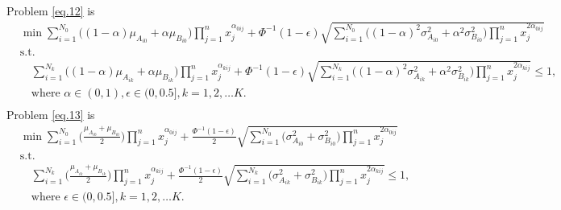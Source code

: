 Problem \ref{eq.12} is
\begin{equation}\label{eq.12}
	\begin{aligned}
		&	\min \sum\limits_{i=1}^{N_0}\big((1-\alpha)\mu_{A_{i0}}+\alpha\mu_{B_{i0}}\big)\prod\limits_{j=1}^{n}x_j^{\alpha_{0ij}}+\Phi^{-1}(1-\epsilon)\sqrt{\sum\limits_{i=1}^{N_0}\big((1-\alpha)^2\sigma_{A_{i0}}^2+\alpha^2\sigma_{B_{i0}}^2\big)\prod\limits_{j=1}^{n}x_j^{2\alpha_{0ij}}} \\
		&	\text{s.t.}\\
		& \quad \sum\limits_{i=1}^{N_k}\big((1-\alpha)\mu_{A_{ik}}+\alpha\mu_{B_{ik}}\big)\prod\limits_{j=1}^{n}x_j^{\alpha_{kij}}+\Phi^{-1}(1-\epsilon)\sqrt{\sum\limits_{i=1}^{N_k}\big((1-\alpha)^2\sigma_{A_{ik}}^2+\alpha^2\sigma_{B_{ik}}^2\big)\prod\limits_{j=1}^{n}x_j^{2\alpha_{kij}}}\leq 1,\\
		& \quad \text{where } \alpha \in (0,1), \epsilon \in(0,0.5], k=1,2,\ldots K.\\
	\end{aligned}
\end{equation}
Problem \ref{eq.13} is
\begin{equation}\label{eq.13}
	\begin{aligned}
		&	\min \sum\limits_{i=1}^{N_0}\bigg(\frac{\mu_{A_{i0}}+\mu_{B_{i0}}}{2}\bigg)\prod\limits_{j=1}^{n}x_j^{\alpha_{0ij}}+\frac{\Phi^{-1}(1-\epsilon)}{2}\sqrt{\sum\limits_{i=1}^{N_0}\big(\sigma_{A_{i0}}^2+\sigma_{B_{i0}}^2\big)\prod\limits_{j=1}^{n}x_j^{2\alpha_{0ij}}} \\
		&	\text{s.t.}\\
		& \quad \sum\limits_{i=1}^{N_k}\bigg(\frac{\mu_{A_{ik}}+\mu_{B_{ik}}}{2}\bigg)\prod\limits_{j=1}^{n}x_j^{\alpha_{kij}}+\frac{\Phi^{-1}(1-\epsilon)}{2}\sqrt{\sum\limits_{i=1}^{N_k}\big(\sigma_{A_{ik}}^2+\sigma_{B_{ik}}^2\big)\prod\limits_{j=1}^{n}x_j^{2\alpha_{kij}}}\leq 1,\\
		& \quad \text{where } \epsilon \in(0,0.5], k=1,2,\ldots K.\\
	\end{aligned}
\end{equation}
